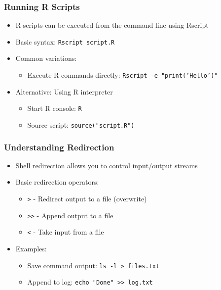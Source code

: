 \documentclass[10pt]{beamer}
\begin{document}
\begin{frame}[fragile]
    \frametitle{Running R Scripts}
    \begin{itemize}
        \item R scripts can be executed from the command line using Rscript
        \item Basic syntax: \colorbox{gray!20}{\texttt{Rscript script.R}}
        \item Common variations:
        \begin{itemize}
            \item Execute R commands directly: \colorbox{gray!20}{\texttt{Rscript -e "print('Hello')"}}
        \end{itemize}
        \item Alternative: Using R interpreter
        \begin{itemize}
            \item Start R console: \colorbox{gray!20}{\texttt{R}}
            \item Source script: \colorbox{gray!20}{\texttt{source("script.R")}}
        \end{itemize}
    \end{itemize}
\end{frame}

\begin{frame}[fragile]
    \frametitle{Understanding Redirection}
    \begin{itemize}
        \item Shell redirection allows you to control input/output streams
        \item Basic redirection operators:
        \begin{itemize}
            \item \colorbox{gray!20}{\texttt{>}} - Redirect output to a file (overwrite)
            \item \colorbox{gray!20}{\texttt{>>}} - Append output to a file
            \item \colorbox{gray!20}{\texttt{<}} - Take input from a file
        \end{itemize}
        \item Examples:
        \begin{itemize}
            \item Save command output: \colorbox{gray!20}{\texttt{ls -l > files.txt}}
            \item Append to log: \colorbox{gray!20}{\texttt{echo "Done" >> log.txt}}
        \end{itemize}
    \end{itemize}
\end{frame}
\end{document}
